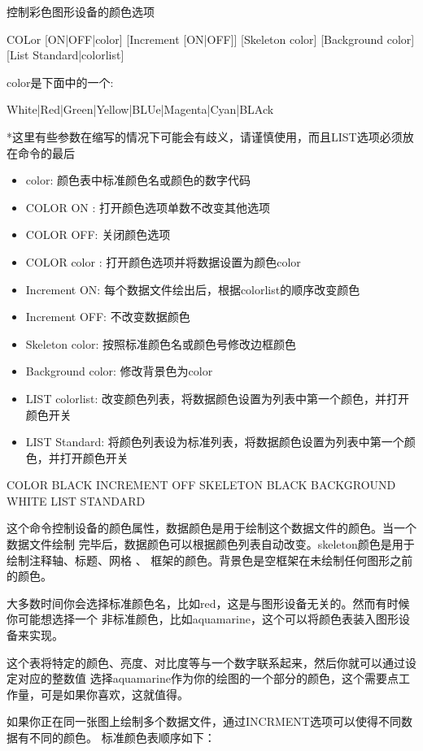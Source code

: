 \label{cmd:color}

控制彩色图形设备的颜色选项

COLor [ON|OFF|color] [Increment [ON|OFF]] [Skeleton color] [Background color] [List Standard|colorlist]

color是下面中的一个:

White|Red|Green|Yellow|BLUe|Magenta|Cyan|BLAck
		
*这里有些参数在缩写的情况下可能会有歧义，请谨慎使用，而且LIST选项必须放在命令的最后

\begin{itemize}
\item color: 颜色表中标准颜色名或颜色的数字代码
\item COLOR ON : 打开颜色选项单数不改变其他选项
\item COLOR OFF: 关闭颜色选项
\item COLOR color : 打开颜色选项并将数据设置为颜色color
\item Increment ON: 每个数据文件绘出后，根据colorlist的顺序改变颜色
\item Increment OFF: 不改变数据颜色 
\item Skeleton color: 按照标准颜色名或颜色号修改边框颜色
\item Background color: 修改背景色为color
\item LIST colorlist: 改变颜色列表，将数据颜色设置为列表中第一个颜色，并打开颜色开关
\item LIST Standard: 将颜色列表设为标准列表，将数据颜色设置为列表中第一个颜色，并打开颜色开关
\end{itemize}

COLOR BLACK INCREMENT OFF SKELETON BLACK BACKGROUND WHITE LIST STANDARD

这个命令控制设备的颜色属性，数据颜色是用于绘制这个数据文件的颜色。当一个数据文件绘制
完毕后，数据颜色可以根据颜色列表自动改变。skeleton颜色是用于绘制注释轴、标题、网格 、
框架的颜色。背景色是空框架在未绘制任何图形之前的颜色。

大多数时间你会选择标准颜色名，比如red，这是与图形设备无关的。然而有时候你可能想选择一个
非标准颜色，比如aquamarine，这个可以将颜色表装入图形设备来实现。

这个表将特定的颜色、亮度、对比度等与一个数字联系起来，然后你就可以通过设定对应的整数值
选择aquamarine作为你的绘图的一个部分的颜色，这个需要点工作量，可是如果你喜欢，这就值得。

如果你正在同一张图上绘制多个数据文件，通过INCRMENT选项可以使得不同数据有不同的颜色。
标准颜色表顺序如下：

